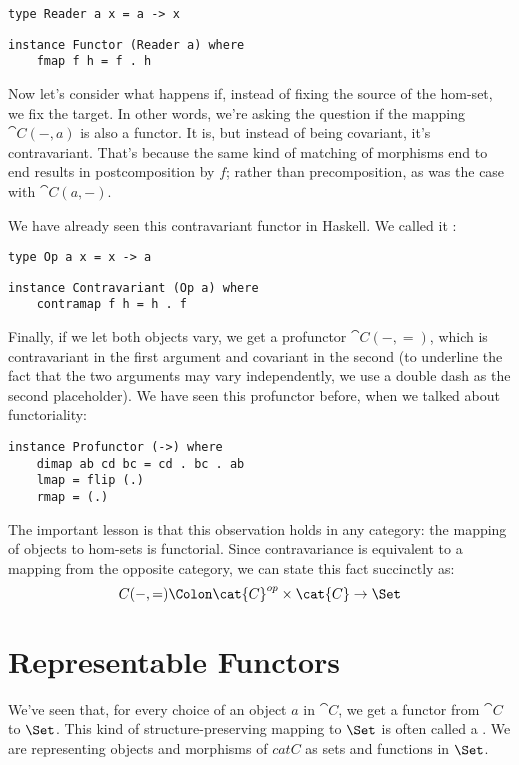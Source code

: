 \begin{Verbatim}
type Reader a x = a -> x
\end{Verbatim}
\begin{Verbatim}
instance Functor (Reader a) where
    fmap f h = f . h
\end{Verbatim}
Now let's consider what happens if, instead of fixing the source of the
hom-set, we fix the target. In other words, we're asking the question if
the mapping $\cat{C}(-, a)$ is also a functor. It is, but instead of being covariant, it's
contravariant. That's because the same kind of matching of morphisms end
to end results in postcomposition by $f$; rather than
precomposition, as was the case with $\cat{C}(a, -)$.

We have already seen this contravariant functor in Haskell. We called it
:

\begin{Verbatim}
type Op a x = x -> a
\end{Verbatim}
\begin{Verbatim}
instance Contravariant (Op a) where
    contramap f h = h . f
\end{Verbatim}
Finally, if we let both objects vary, we get a profunctor
$\cat{C}(-, =)$, which is contravariant in the first argument and
covariant in the second (to underline the fact that the two arguments
may vary independently, we use a double dash as the second placeholder).
We have seen this profunctor before, when we talked about functoriality:

\begin{Verbatim}
instance Profunctor (->) where
    dimap ab cd bc = cd . bc . ab
    lmap = flip (.)
    rmap = (.)
\end{Verbatim}
The important lesson is that this observation holds in any category: the
mapping of objects to hom-sets is functorial. Since contravariance is
equivalent to a mapping from the opposite category, we can state this
fact succinctly as:
\[C(-, =) \Colon \cat{C}^{op} \times \cat{C} \to \Set\]

\section{Representable Functors}

We've seen that, for every choice of an object $a$ in $\cat{C}$,
we get a functor from $\cat{C}$ to $\Set$. This kind of
structure-preserving mapping to $\Set$ is often called a
. We are representing objects and morphisms of
$cat{C}$ as sets and functions in $\Set$.

